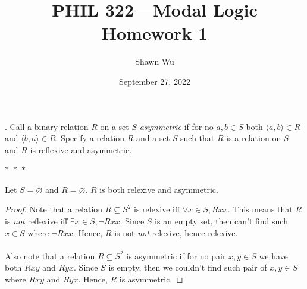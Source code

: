 \documentclass[12pt]{article}
\title{PHIL 322---Modal Logic \\Homework 1}
\author{Shawn Wu}
\date{September 27, 2022}
\begin{document}
\maketitle
. Call a binary relation $R$ on a set $S$ \emph{asymmetric} if for no $a,b \in S$ 
both $\langle a, b \rangle \in R$ and $\langle b, a \rangle \in R$. Specify a 
relation $R$ and a set $S$ such that $R$ is a relation on $S$ and $R$ is reflexive 
and asymmetric.
\begin{center}
    $\ast$~$\ast$~$\ast$
\end{center}
Let $S = \varnothing$ and $R = \varnothing$. $R$ is both relexive and asymmetric.
\begin{proof}
Note that a relation $R \subseteq S^2$ is relexive iff $\forall x \in S, Rxx.$
This means that $R$ is \emph{not} reflexive iff $\exists x \in S, \neg Rxx$.
Since $S$ is an empty set, then can't find such $x \in S$ where $\neg Rxx$.
Hence, $R$ is not \emph{not} relexive, hence relexive.\\
\\
Also note that a relation $R \subseteq S^2$ is asymmetric if for no pair $x,y \in S$ we have both $Rxy$ and $Ryx.$
Since $S$ is empty, then we couldn't find such pair of $x,y \in S$ where $Rxy$ and $Ryx$.
Hence, $R$ is asymmetric. 
\end{proof}
\end{document}
